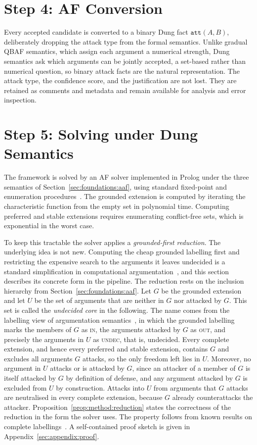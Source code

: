 \section{Step 4: AF Conversion}
\label{sec:method:conversion}

Every accepted candidate is converted to a binary Dung fact
$\texttt{att}(A, B)$, deliberately dropping the attack type from the formal
semantics. Unlike gradual QBAF semantics, which assign each argument a numerical
strength, Dung semantics ask which arguments can be jointly accepted, a set-based
rather than numerical question, so binary attack facts are the natural
representation. The attack type, the confidence score, and the justification are
not lost. They are retained as comments and metadata and remain available for
analysis and error inspection.

\section{Step 5: Solving under Dung Semantics}
\label{sec:method:solver}

The framework is solved by an AF solver implemented in Prolog under the three
semantics of Section~\ref{sec:foundations:aaf}, using standard fixed-point and
enumeration procedures~\cite{cerutti2017}. The grounded extension is computed by
iterating the characteristic function from the empty set in polynomial time.
Computing preferred and stable extensions requires enumerating conflict-free
sets, which is exponential in the worst case.

To keep this tractable the solver applies a \emph{grounded-first reduction}.
The underlying idea is not new. Computing the cheap grounded labelling first
and restricting the expensive search to the arguments it leaves undecided is a
standard simplification in computational argumentation~\cite{baroni2011,
charwat2015}, and this section describes its concrete form in the pipeline.
The reduction rests on the inclusion hierarchy from
Section~\ref{sec:foundations:aaf}. Let $G$ be the grounded extension and let
$U$ be the set of arguments that are neither in $G$ nor attacked by $G$. This
set is called the \emph{undecided core} in the following. The name comes from
the labelling view of argumentation semantics~\cite{baroni2011}, in which the
grounded labelling marks the members of $G$ as \textsc{in}, the arguments
attacked by $G$ as \textsc{out}, and precisely the arguments in $U$ as
\textsc{undec}, that is, undecided. Every complete extension, and hence every
preferred and stable extension, contains $G$ and excludes all arguments $G$
attacks, so the only freedom left lies in $U$. Moreover, no argument in $U$
attacks or is attacked by $G$, since an attacker of a member of $G$ is itself
attacked by $G$ by definition of defense, and any argument attacked by $G$ is
excluded from $U$ by construction. Attacks into $U$ from arguments that $G$
attacks are neutralised in every complete extension, because $G$ already
counterattacks the attacker. Proposition~\ref{prop:method:reduction} states the
correctness of the reduction in the form the solver uses. The property follows
from known results on complete labellings~\cite{baroni2011}. A self-contained
proof sketch is given in Appendix~\ref{sec:appendix:proof}.

